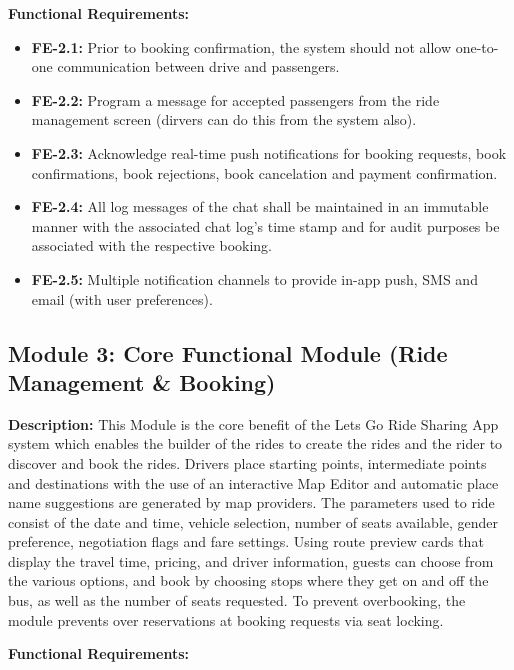 \textbf{Functional Requirements:}

\begin{itemize}
    \item \textbf{FE-2.1:} Prior to booking confirmation, the system should not allow one-to-one communication between drive and passengers.

    \item \textbf{FE-2.2:} Program a message for accepted passengers from the ride management screen (dirvers can do this from the system also).

    \item \textbf{FE-2.3:} Acknowledge real-time push notifications for booking requests, book confirmations, book rejections, book cancelation and payment confirmation.

    \item \textbf{FE-2.4:} All log messages of the chat shall be maintained in an immutable manner with the associated chat log's time stamp and for audit purposes be associated with the respective booking.

    \item \textbf{FE-2.5:} Multiple notification channels to provide in-app push, SMS and email (with user preferences).
\end{itemize}

\subsection{Module 3: Core Functional Module (Ride Management \& Booking)}

\textbf{Description:} This Module is the core benefit of the Lets Go Ride Sharing App system which enables the builder of the rides to create the rides and the rider to discover and book the rides. Drivers place starting points, intermediate points and destinations with the use of an interactive Map Editor and automatic place name suggestions are generated by map providers. The parameters used to ride consist of the date and time, vehicle selection, number of seats available, gender preference, negotiation flags and fare settings. Using route preview cards that display the travel time, pricing, and driver information, guests can choose from the various options, and book by choosing stops where they get on and off the bus, as well as the number of seats requested. To prevent overbooking, the module prevents over reservations at booking requests via seat locking.


\textbf{Functional Requirements:}

